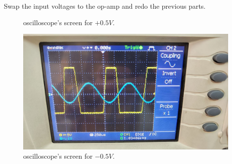 \documentclass[11pt]{article}
\newcommand{\PicScale}{0.2}
\begin{document}
\begin{question}
\begin{subquestion}{Swap the input voltages to the op-amp and redo the previous parts.}
{\begin{figure}[H]
                    \caption{oscilloscope's screen for $+0.5V$.}
                \end{figure}
                \begin{figure}[H]
                    \centering
                    \includegraphics[scale=\PicScale,angle=0]{Fig/13.jpeg}
                    \caption{oscilloscope's screen for $-0.5V$.}
                \end{figure}

        }
    \end{subquestion}


\end{question}

\end{document}

